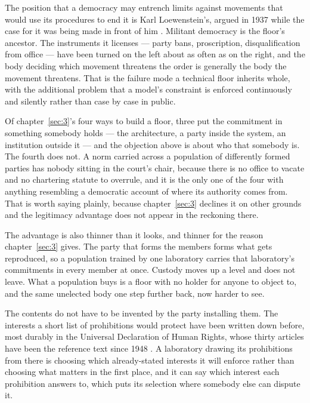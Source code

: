The position that a democracy may entrench limits against movements that would use its procedures to end it is Karl Loewenstein's, argued in 1937 while the case for it was being made in front of him \autocite{loewenstein1937militant}. Militant democracy is the floor's ancestor. The instruments it licenses — party bans, proscription, disqualification from office — have been turned on the left about as often as on the right, and the body deciding which movement threatens the order is generally the body the movement threatens. That is the failure mode a technical floor inherits whole, with the additional problem that a model's constraint is enforced continuously and silently rather than case by case in public.

Of chapter~\ref{sec:3}'s four ways to build a floor, three put the commitment in something somebody holds — the architecture, a party inside the system, an institution outside it — and the objection above is about who that somebody is. The fourth does not. A norm carried across a population of differently formed parties has nobody sitting in the court's chair, because there is no office to vacate and no chartering statute to overrule, and it is the only one of the four with anything resembling a democratic account of where its authority comes from. That is worth saying plainly, because chapter~\ref{sec:3} declines it on other grounds and the legitimacy advantage does not appear in the reckoning there.

The advantage is also thinner than it looks, and thinner for the reason chapter~\ref{sec:3} gives. The party that forms the members forms what gets reproduced, so a population trained by one laboratory carries that laboratory's commitments in every member at once. Custody moves up a level and does not leave. What a population buys is a floor with no holder for anyone to object to, and the same unelected body one step further back, now harder to see.

The contents do not have to be invented by the party installing them. The interests a short list of prohibitions would protect have been written down before, most durably in the Universal Declaration of Human Rights, whose thirty articles have been the reference text since 1948 \autocite{un1948udhr}. A laboratory drawing its prohibitions from there is choosing which already-stated interests it will enforce rather than choosing what matters in the first place, and it can say which interest each prohibition answers to, which puts its selection where somebody else can dispute it.

